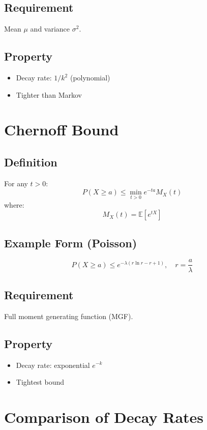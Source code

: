 \documentclass[12pt]{article}
\begin{document}
\subsection*{Requirement}
Mean $\mu$ and variance $\sigma^2$.

\subsection*{Property}
\begin{itemize}
    \item Decay rate: $1/k^2$ (polynomial)
    \item Tighter than Markov
\end{itemize}

\section*{Chernoff Bound}

\subsection*{Definition}
For any $t > 0$:
\[
P(X \ge a) \le \min_{t>0} e^{-ta} M_X(t)
\]
where:
\[
M_X(t) = \mathbb{E}[e^{tX}]
\]

\subsection*{Example Form (Poisson)}
\[
P(X \ge a) \le e^{-\lambda(r\ln r - r + 1)}, \quad r = \frac{a}{\lambda}
\]

\subsection*{Requirement}
Full moment generating function (MGF).

\subsection*{Property}
\begin{itemize}
    \item Decay rate: exponential $e^{-k}$
    \item Tightest bound
\end{itemize}

\section*{Comparison of Decay Rates}
\end{document}
